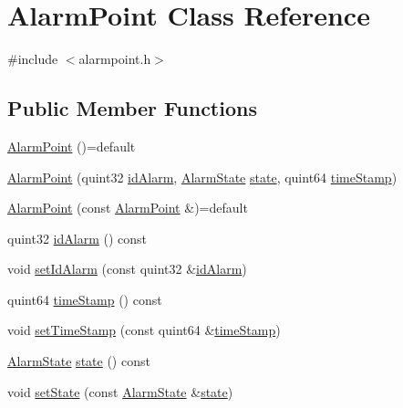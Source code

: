 \hypertarget{class_alarm_point}{}\section{Alarm\+Point Class Reference}
\label{class_alarm_point}


{\ttfamily \#include $<$alarmpoint.\+h$>$}

\subsection*{Public Member Functions}
\begin{DoxyCompactItemize}
\item 
\hyperlink{class_alarm_point_aa4d81b3b1b8436dc27f30ad55237ab80}{Alarm\+Point} ()=default
\item 
\hyperlink{class_alarm_point_af0c75bae426623b51a588267df5363e6}{Alarm\+Point} (quint32 \hyperlink{class_alarm_point_a73b7656f51ea16aa2a8c0dd88333852b}{id\+Alarm}, \hyperlink{alarm__states__enum_8h_a493dfe4e2144bc496098813185ca09bf}{Alarm\+State} \hyperlink{class_alarm_point_aee724fd6f27e5e7a9a0613f77db7fabf}{state}, quint64 \hyperlink{class_alarm_point_a9a05c45965eb312ac66737f43e18e6fe}{time\+Stamp})
\item 
\hyperlink{class_alarm_point_a9483125e83b28a6be6e05911772b51f1}{Alarm\+Point} (const \hyperlink{class_alarm_point}{Alarm\+Point} \&)=default
\item 
quint32 \hyperlink{class_alarm_point_a73b7656f51ea16aa2a8c0dd88333852b}{id\+Alarm} () const 
\item 
void \hyperlink{class_alarm_point_ac840b685e4f97245f02070d0731a2565}{set\+Id\+Alarm} (const quint32 \&\hyperlink{class_alarm_point_a73b7656f51ea16aa2a8c0dd88333852b}{id\+Alarm})
\item 
quint64 \hyperlink{class_alarm_point_a9a05c45965eb312ac66737f43e18e6fe}{time\+Stamp} () const 
\item 
void \hyperlink{class_alarm_point_a8fa55303217ad5698a91a6def6900ecf}{set\+Time\+Stamp} (const quint64 \&\hyperlink{class_alarm_point_a9a05c45965eb312ac66737f43e18e6fe}{time\+Stamp})
\item 
\hyperlink{alarm__states__enum_8h_a493dfe4e2144bc496098813185ca09bf}{Alarm\+State} \hyperlink{class_alarm_point_aee724fd6f27e5e7a9a0613f77db7fabf}{state} () const 
\item 
void \hyperlink{class_alarm_point_ac6e296387ced1b574c9a7f8615882af3}{set\+State} (const \hyperlink{alarm__states__enum_8h_a493dfe4e2144bc496098813185ca09bf}{Alarm\+State} \&\hyperlink{class_alarm_point_aee724fd6f27e5e7a9a0613f77db7fabf}{state})
\end{DoxyCompactItemize}


